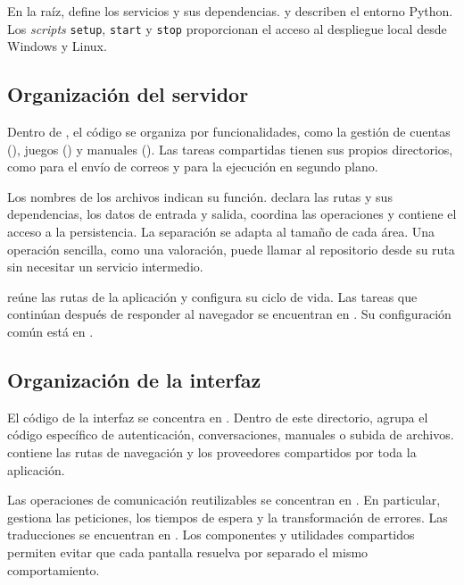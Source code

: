 En la raíz,  define los servicios y sus dependencias.  y  describen el entorno Python. Los \textit{scripts} \texttt{setup}, \texttt{start} y \texttt{stop} proporcionan el acceso al despliegue local desde Windows y Linux.

\subsection{Organización del servidor}

Dentro de , el código se organiza por funcionalidades, como
la gestión de cuentas (), juegos () y manuales
(). Las tareas compartidas tienen sus propios directorios, como
 para el envío de correos y  para la ejecución en
segundo plano.

Los nombres de los archivos indican su función.  declara las rutas y sus dependencias,  los datos de entrada y salida,  coordina las operaciones y  contiene el acceso a la persistencia. La separación se adapta al tamaño de cada área. Una operación sencilla, como una valoración, puede llamar al repositorio desde su ruta sin necesitar un servicio intermedio.

 reúne las rutas de la aplicación y configura su ciclo de vida. Las tareas que continúan después de responder al navegador se encuentran en . Su configuración común está en .

\subsection{Organización de la interfaz}

El código de la interfaz se concentra en . Dentro de este directorio,  agrupa el código específico de autenticación, conversaciones, manuales o subida de archivos.  contiene las rutas de navegación y  los proveedores compartidos por toda la aplicación.

Las operaciones de comunicación reutilizables se concentran en . En particular,  gestiona las peticiones, los tiempos de espera y la transformación de errores. Las traducciones se encuentran en . Los componentes y utilidades compartidos permiten evitar que cada pantalla resuelva por separado el mismo comportamiento.

